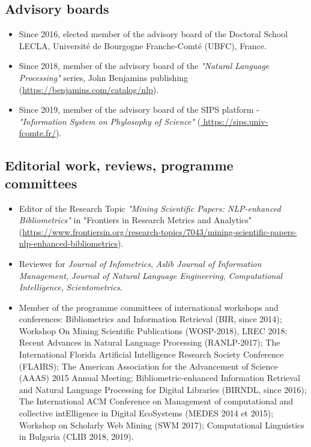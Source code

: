 \documentclass[11pt,a4paper,roman]{moderncv}
\begin{document}
\subsection{Advisory boards}

\begin{itemize}
	\item Since 2016, elected member of the advisory board of the Doctoral School LECLA,  Université de Bourgogne Franche-Comté (UBFC), France.

	\item Since 2018, member of the advisory board of the \textit{"Natural Language Processing"} series, John Benjamins publishing (\url{https://benjamins.com/catalog/nlp}).

	\item Since 2019, member of the advisory board of the SIPS platform - \textit{"Information System on Phylosophy of Science"} (\url{ https://sips.univ-fcomte.fr/}).
\end{itemize}


\subsection{Editorial work, reviews, programme committees}

\begin{itemize}
	\item Editor of the Research Topic \textit{"Mining Scientific Papers: NLP-enhanced Bibliometrics"} in {"Frontiers in Research Metrics and Analytics"} (\url{https://www.frontiersin.org/research-topics/7043/mining-scientific-papers-nlp-enhanced-bibliometrics}).

	\item Reviewer for \textit{Journal of Infometrics}, \textit{Aslib Journal of Information Management}, \textit{Journal of Natural Language Engineering}, \textit{Computational Intelligence}, \textit{Scientometrics}.

	\item Member of the programme committees of international workshops and conferences: Bibliometrics and Information Retrieval (BIR, since 2014); Workshop On Mining Scientific Publications (WOSP-2018), LREC 2018; Recent Advances in Natural Language Processing (RANLP-2017); The International Florida Artificial Intelligence Research Society Conference (FLAIRS); The American Association for the Advancement of Science (AAAS) 2015 Annual Meeting; Bibliometric-enhanced Information Retrieval and Natural Language Processing for Digital Libraries (BIRNDL, since 2016); The International ACM Conference on Management of computational and collective intElligence in Digital EcoSystems (MEDES 2014 et 2015); Workshop on Scholarly Web Mining (SWM 2017); Computational Linguistics in Bulgaria (CLIB 2018, 2019).


\end{itemize}
\end{document}
